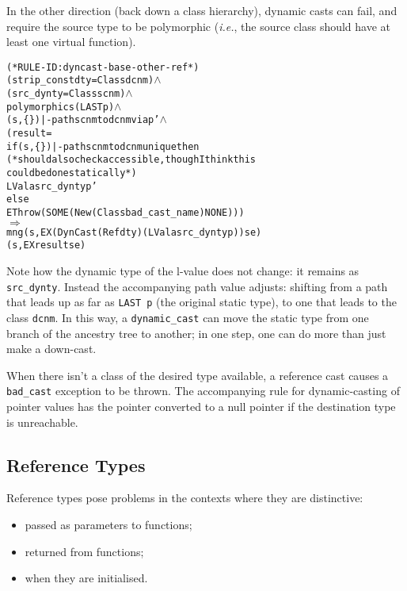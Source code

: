 \documentclass[11pt]{article}
\newcommand{\ie}{\emph{i.e.}}
\newcommand{\lbr}{\texttt{\{}}
\newcommand{\rbr}{\texttt{\}}}
\begin{document}
In the other direction (back down a class hierarchy), dynamic casts
can fail, and require the source type to be polymorphic (\ie, the
source class should have at least one virtual function).
\begin{center}
\begin{minipage}{\textwidth}
%
\begin{alltt}
(* RULE-ID: dyncast-base-other-ref *)
     (strip_const dty = Class dcnm) \(\land\)
     (src_dynty = Class scnm) \(\land\)
     polymorphic s (LAST p) \(\land\)
     (s,\lbr\rbr) |- path scnm to dcnm via p' \(\land\)
     (result =
      if (s,\lbr\rbr) |- path scnm to dcnm unique then
        (* should also check accessible, though I think this
           could be done statically *)
        LVal a src_dynty p'
      else
        EThrow (SOME (New (Class bad_cast_name) NONE)))
   \(\Rightarrow\)
     mng (s, EX (DynCast (Ref dty) (LVal a src_dynty p)) se)
         (s, EX result se)
\end{alltt}
\end{minipage}
\end{center}
Note how the dynamic type of the l-value does not change: it remains
as \texttt{src_dynty}.  Instead the accompanying path value adjusts:
shifting from a path that leads up as far as \texttt{LAST~p} (the
original static type), to one that leads to the class \texttt{dcnm}.
In this way, a \texttt{dynamic_cast} can move the static type from one
branch of the ancestry tree to another; in one step, one can do more
than just make a down-cast.

When there isn't a class of the desired type available, a reference
cast causes a \texttt{bad_cast} exception to be thrown.  The
accompanying rule for dynamic-casting of pointer values has the
pointer converted to a null pointer if the destination type is unreachable.


\subsection{Reference Types}
\label{sec:reftypes}

Reference types pose problems in the contexts where they are
distinctive:
\begin{itemize}
\item passed as parameters to functions;
\item returned from functions;
\item when they are initialised.
\end{itemize}
\end{document}
